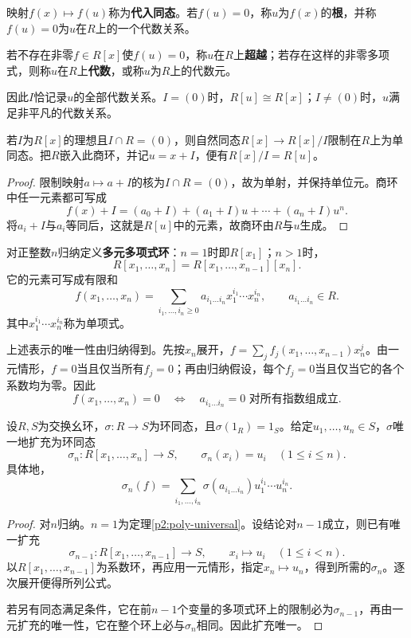 \begin{definition}\label{p2:concept:c3-evaluation}
映射$f(x)\mapsto f(u)$称为\textbf{代入同态}。若$f(u)=0$，称$u$为$f(x)$的\textbf{根}，并称$f(u)=0$为$u$在$R$上的一个代数关系。

若不存在非零$f\in R[x]$使$f(u)=0$，称$u$在$R$上\textbf{超越}；若存在这样的非零多项式，则称$u$在$R$上\textbf{代数}，或称$u$为$R$上的代数元。
\end{definition}

因此$I$恰记录$u$的全部代数关系。$I=(0)$时，$R[u]\cong R[x]$；$I\ne(0)$时，$u$满足非平凡的代数关系。

\begin{proposition}
若$I$为$R[x]$的理想且$I\cap R=(0)$，则自然同态$R[x]\to R[x]/I$限制在$R$上为单同态。把$R$嵌入此商环，并记$u=x+I$，便有$R[x]/I=R[u]$。
\end{proposition}
\begin{proof}
限制映射$a\mapsto a+I$的核为$I\cap R=(0)$，故为单射，并保持单位元。商环中任一元素都可写成
\[
f(x)+I=(a_0+I)+(a_1+I)u+\cdots+(a_n+I)u^n.
\]
将$a_i+I$与$a_i$等同后，这就是$R[u]$中的元素，故商环由$R$与$u$生成。
\end{proof}

\begin{definition}\label{p2:concept:c3-multivariate-ring}
对正整数$n$归纳定义\textbf{多元多项式环}：$n=1$时即$R[x_1]$；$n>1$时，
\[
R[x_1,\ldots,x_n]=R[x_1,\ldots,x_{n-1}][x_n].
\]
它的元素可写成有限和
\[
f(x_1,\ldots,x_n)
=\sum_{i_1,\ldots,i_n\ge0}a_{i_1\ldots i_n}x_1^{i_1}\cdots x_n^{i_n},
\qquad a_{i_1\ldots i_n}\in R.
\]
其中$x_1^{i_1}\cdots x_n^{i_n}$称为单项式。
\end{definition}

上述表示的唯一性由归纳得到。先按$x_n$展开，$f=\sum_j f_j(x_1,\ldots,x_{n-1})x_n^j$。由一元情形，$f=0$当且仅当所有$f_j=0$；再由归纳假设，每个$f_j=0$当且仅当它的各个系数均为零。因此
\[
f(x_1,\ldots,x_n)=0
\quad\Longleftrightarrow\quad
a_{i_1\ldots i_n}=0\text{ 对所有指数组成立}.
\]

\begin{theorem}\label{p2:multi-poly-universal}
设$R,S$为交换幺环，$\sigma:R\to S$为环同态，且$\sigma(1_R)=1_S$。给定$u_1,\ldots,u_n\in S$，$\sigma$唯一地扩充为环同态
\[
\sigma_n:R[x_1,\ldots,x_n]\to S,
\qquad \sigma_n(x_i)=u_i\quad(1\le i\le n).
\]
具体地，
\[
\sigma_n(f)=\sum_{i_1,\ldots,i_n}
\sigma(a_{i_1\ldots i_n})u_1^{i_1}\cdots u_n^{i_n}.
\]
\end{theorem}
\begin{proof}
对$n$归纳。$n=1$为定理\ref{p2:poly-universal}。设结论对$n-1$成立，则已有唯一扩充
\[
\sigma_{n-1}:R[x_1,\ldots,x_{n-1}]\to S,
\qquad x_i\mapsto u_i\quad(1\le i<n).
\]
以$R[x_1,\ldots,x_{n-1}]$为系数环，再应用一元情形，指定$x_n\mapsto u_n$，得到所需的$\sigma_n$。逐次展开便得所列公式。

若另有同态满足条件，它在前$n-1$个变量的多项式环上的限制必为$\sigma_{n-1}$，再由一元扩充的唯一性，它在整个环上必与$\sigma_n$相同。因此扩充唯一。
\end{proof}

